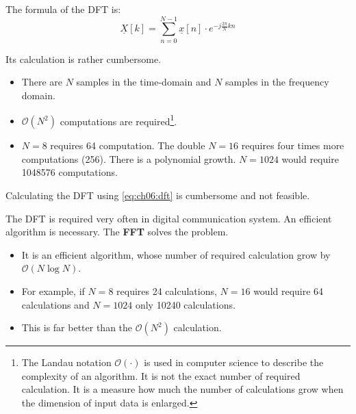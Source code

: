 \begin{refsection}
The formula of the \ac{DFT} is:
\begin{equation}
	\underline{X}[k] = \sum\limits_{n = 0}^{N - 1} \underline{x}[n] \cdot e^{- j \frac{2 \pi}{N} k n}
	\label{eq:ch06:dft}
\end{equation}

Its calculation is rather cumbersome.
\begin{itemize}
	\item There are $N$ samples in the time-domain and $N$ samples in the frequency domain. 
	\item $\mathcal{O}\left(N^2\right)$ computations are required\footnote{The Landau notation $\mathcal{O}\left(\cdot\right)$ is used in computer science to describe the complexity of an algorithm. It is not the exact number of required calculation. It is a measure how much the number of calculations grow when the dimension of input data is enlarged.}.
	\item $N = 8$ requires \num{64} computation. The double $N=16$ requires four times more computations (\num{256}). There is a polynomial growth. $N = 1024$ would require \num{1048576} computations.
\end{itemize}

\begin{fact}
	Calculating the \ac{DFT} using \eqref{eq:ch06:dft} is cumbersome and not feasible.
\end{fact}

The \ac{DFT} is required very often in digital communication system. An efficient algorithm is necessary. The  \textbf{\acf{FFT}} solves the problem.
\begin{itemize}
	\item It is an efficient algorithm, whose number of required calculation grow by $\mathcal{O}\left(N \log N\right)$.
	\item For example, if $N=8$ requires \num{24} calculations, $N=16$ would require \num{64} calculations and $N = 1024$ only \num{10240} calculations.
	\item This is far better than the $\mathcal{O}\left(N^2\right)$ calculation.
\end{itemize}


\end{refsection}
